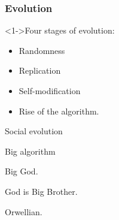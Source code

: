 \begin{frame}
\frametitle{Evolution}

\begin{block}<1->{Four stages of evolution:}
  \begin{itemize}
  \item 
    Randomness
  \item 
    Replication
  \item 
    Self-modification
  \item 
    Rise of the algorithm.
  \end{itemize}
\end{block}

Social evolution

Big algorithm

Big God.

God is Big Brother.

Orwellian.


\end{frame}